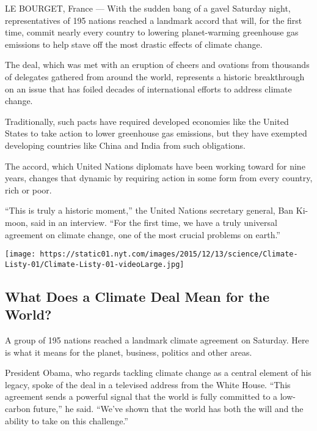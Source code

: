 LE BOURGET, France --- With the sudden bang of a gavel Saturday night,
representatives of 195 nations reached a landmark accord that will, for
the first time, commit nearly every country to lowering planet-warming
greenhouse gas emissions to help stave off the most drastic effects of
climate change.

The deal, which was met with an eruption of cheers and ovations from
thousands of delegates gathered from around the world, represents a
historic breakthrough on an issue that has foiled decades of
international efforts to address climate change.

Traditionally, such pacts have required developed economies like the
United States to take action to lower greenhouse gas emissions, but they
have exempted developing countries like China and India from such
obligations.

The accord, which United Nations diplomats have been working toward for
nine years, changes that dynamic by requiring action in some form from
every country, rich or poor.

``This is truly a historic moment,'' the United Nations secretary
general, Ban Ki-moon, said in an interview. ``For the first time, we
have a truly universal agreement on climate change, one of the most
crucial problems on earth.''

\href{https://www.nytimes.com/interactive/2015/12/12/science/What-Does-the-Climate-Deal-Mean.html}{}

\texttt{[image: https://static01.nyt.com/images/2015/12/13/science/Climate-Listy-01/Climate-Listy-01-videoLarge.jpg]}

\hypertarget{what-does-a-climate-deal-mean-for-the-world}{%
\subsection{What Does a Climate Deal Mean for the
World?}\label{what-does-a-climate-deal-mean-for-the-world}}

A group of 195 nations reached a landmark climate agreement on Saturday.
Here is what it means for the planet, business, politics and other
areas.

President Obama, who regards tackling climate change as a central
element of his legacy, spoke of the deal in a televised address from the
White House. ``This agreement sends a powerful signal that the world is
fully committed to a low-carbon future,'' he said. ``We've shown that
the world has both the will and the ability to take on this challenge.''

